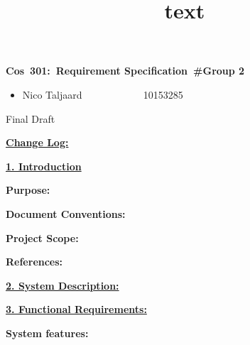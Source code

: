 \documentclass[12pt]{article}
\newcommand{\Title}{Requirement Specification\ \#Group 2} %
\newcommand{\Class}{Cos\ 301} %
\begin{document}
\title{text}
	\vspace{2in}
	\hspace{1.2in}
	\textmd{\textbf{\Class:\ \Title}}\\
	\vspace{2in}


\begin{itemize} %
	\item Nico Taljaard \ ~~~~~~~~~ \ 10153285
\end{itemize}

\vspace{2in}
\hspace{2.5in} 
	Final Draft

\newpage
	\textbf{\underline{Change Log:}}
	
	\begin{itemize}
	
	\end{itemize}
	
\newpage
	\textbf{\underline{1. Introduction}}
	
	\vspace{0.2in}

		\textbf{Purpose:}
		\vspace{0.1in}
		
	
	\vspace{0.2in}
	
		\textbf{Document Conventions:}
		\vspace{0.1in}
		
	
	\vspace{0.2in}
	
		\textbf{Project Scope:}
		\vspace{0.1in}
		
		
	
	\vspace{0.2in}
	
		\textbf{References:}
		\vspace{0.1in}
			
	
	\vspace{0.5in}
	
	\textbf{\underline{2. System Description:}}
	\vspace{0.2in}
		
		
	
	\vspace{0.5in}
	
	\newpage
	\textbf{\underline{3. Functional Requirements:}}
	\vspace{0.2in}
		
		\textbf{System features:}
		\vspace{0.1in}
		
\end{document}
